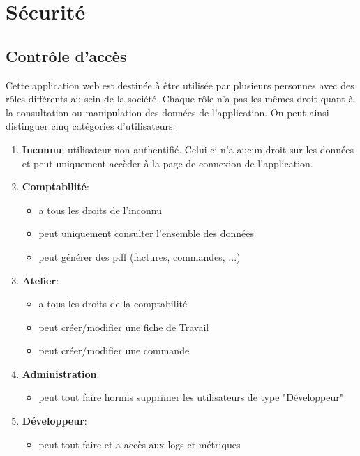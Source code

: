 \section{Sécurité}

\subsection{Contrôle d'accès}
Cette application web est destinée à être utilisée par plusieurs personnes avec des rôles différents au sein de la société. Chaque rôle n'a pas les mêmes droit quant à la consultation ou manipulation des données de l'application. On peut ainsi distinguer cinq catégories d'utilisateurs: 
\begin{enumerate}
  \item \textbf{Inconnu}: utilisateur non-authentifié. Celui-ci n'a aucun droit sur les données et peut uniquement accèder à la page de connexion de l'application. 
  \item \textbf{Comptabilité}: 
  \begin{itemize}
    \item a tous les droits de l'inconnu
    \item peut uniquement consulter l'ensemble des données 
    \item peut générer des pdf (factures, commandes, ...)
  \end{itemize}
  \item \textbf{Atelier}: 
  \begin{itemize}
    \item a tous les droits de la comptabilité
    \item peut créer/modifier une fiche de Travail
    \item peut créer/modifier une commande
  \end{itemize}
  \item \textbf{Administration}: 
  \begin{itemize}
    \item peut tout faire hormis supprimer les utilisateurs de type "Développeur"
  \end{itemize}
  \item \textbf{Développeur}: 
  \begin{itemize}
    \item peut tout faire et a accès aux logs et métriques
  \end{itemize}
\end{enumerate}

\newpara

